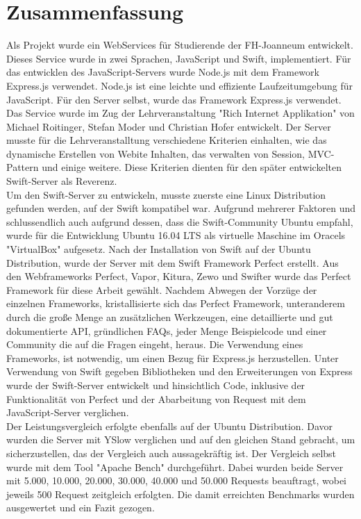 \chapter{Zusammenfassung}
\label{chap:Zusammenfassung}

\chapterstart

Als Projekt wurde ein WebServices für Studierende der FH-Joanneum entwickelt. Dieses Service wurde in zwei Sprachen, JavaScript und Swift, implementiert. Für das entwicklen des JavaScript-Servers wurde Node.js mit dem Framework Express.js verwendet. Node.js ist eine leichte und effiziente Laufzeitumgebung für JavaScript. Für den Server selbst, wurde das Framework Express.js verwendet. Das Service wurde im Zug der Lehrveranstaltung "Rich Internet Applikation" von Michael Roitinger, Stefan Moder und Christian Hofer entwickelt. Der Server musste für die Lehrveranstalltung verschiedene Kriterien einhalten, wie das dynamische Erstellen von Webite Inhalten, das verwalten von Session, MVC-Pattern und einige weitere. Diese Kriterien dienten für den später entwickelten Swift-Server als Reverenz.\\
Um den Swift-Server zu entwickeln, musste zuerste eine Linux Distribution gefunden werden, auf der Swift kompatibel war. Aufgrund mehrerer Faktoren und schlussendlich auch aufgrund dessen, dass die Swift-Community Ubuntu empfahl, wurde für die Entwicklung Ubuntu 16.04 LTS als virtuelle Maschine im Oracels "VirtualBox" aufgesetz. Nach der Installation von Swift auf der Ubuntu Distribution, wurde der Server mit dem Swift Framework Perfect erstellt. Aus den Webframeworks Perfect, Vapor, Kitura, Zewo und Swifter wurde das Perfect Framework für diese Arbeit gewählt. Nachdem Abwegen der Vorzüge der einzelnen Frameworks, kristallisierte sich das Perfect Framework, unteranderem durch die große Menge an zusätzlichen Werkzeugen, eine detaillierte und gut dokumentierte API, gründlichen FAQs, jeder Menge Beispielcode und einer Community die auf die Fragen eingeht, heraus. Die Verwendung eines Frameworks, ist notwendig, um einen Bezug für Express.js herzustellen. Unter Verwendung von Swift gegeben Bibliotheken und den Erweiterungen von Express wurde der Swift-Server entwickelt und hinsichtlich Code, inklusive der Funktionalität von Perfect und der Abarbeitung von Request mit dem JavaScript-Server verglichen. \\
Der Leistungsvergleich erfolgte ebenfalls auf der Ubuntu Distribution. Davor wurden die Server mit YSlow verglichen und auf den gleichen Stand gebracht, um sicherzustellen, das der Vergleich auch aussagekräftig ist. Der Vergleich selbst wurde mit dem Tool "Apache Bench" durchgeführt. Dabei wurden beide Server mit 5.000, 10.000, 20.000, 30.000, 40.000 und 50.000 Requests beauftragt, wobei jeweils 500 Request zeitgleich erfolgten. Die damit erreichten Benchmarks wurden ausgewertet und ein Fazit gezogen.\\
